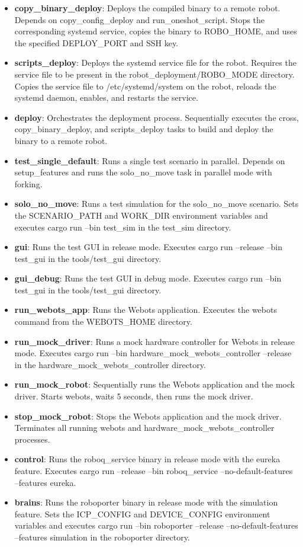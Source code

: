 \begin{itemize}
    \item \textbf{copy\_binary\_deploy}: Deploys the compiled binary to a remote robot. Depends on copy\_config\_deploy and run\_oneshot\_script. Stops the corresponding systemd service, copies the binary to ROBO\_HOME, and uses the specified DEPLOY\_PORT and SSH key.
    \item \textbf{scripts\_deploy}: Deploys the systemd service file for the robot. Requires the service file to be present in the robot\_deployment/ROBO\_MODE directory. Copies the service file to /etc/systemd/system on the robot, reloads the systemd daemon, enables, and restarts the service.
    \item \textbf{deploy}: Orchestrates the deployment process. Sequentially executes the cross, copy\_binary\_deploy, and scripts\_deploy tasks to build and deploy the binary to a remote robot.
    \item \textbf{test\_single\_default}: Runs a single test scenario in parallel. Depends on setup\_features and runs the solo\_no\_move task in parallel mode with forking.
    \item \textbf{solo\_no\_move}: Runs a test simulation for the solo\_no\_move scenario. Sets the SCENARIO\_PATH and WORK\_DIR environment variables and executes cargo run --bin test\_sim in the test\_sim directory.
    \item \textbf{gui}: Runs the test GUI in release mode. Executes cargo run --release --bin test\_gui in the tools/test\_gui directory.
    \item \textbf{gui\_debug}: Runs the test GUI in debug mode. Executes cargo run --bin test\_gui in the tools/test\_gui directory.
    \item \textbf{run\_webots\_app}: Runs the Webots application. Executes the webots command from the WEBOTS\_HOME directory.
    \item \textbf{run\_mock\_driver}: Runs a mock hardware controller for Webots in release mode. Executes cargo run --bin hardware\_mock\_webots\_controller --release in the hardware\_mock\_webots\_controller directory.
    \item \textbf{run\_mock\_robot}: Sequentially runs the Webots application and the mock driver. Starts webots, waits 5 seconds, then runs the mock driver.
    \item \textbf{stop\_mock\_robot}: Stops the Webots application and the mock driver. Terminates all running webots and hardware\_mock\_webots\_controller processes.
    \item \textbf{control}: Runs the roboq\_service binary in release mode with the eureka feature. Executes cargo run --release --bin roboq\_service --no-default-features --features eureka.
    \item \textbf{brains}: Runs the roboporter binary in release mode with the simulation feature. Sets the ICP\_CONFIG and DEVICE\_CONFIG environment variables and executes cargo run --bin roboporter --release --no-default-features --features simulation in the roboporter directory.
\end{itemize}

